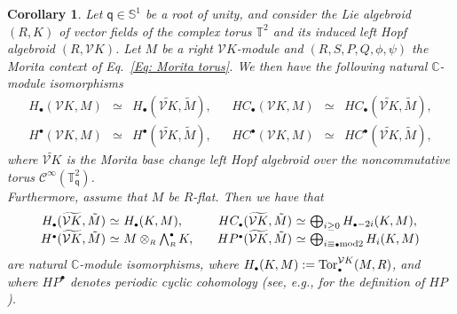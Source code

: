 \documentclass[reqno, a4paper, 10pt]{amsart}
\numberwithin{equation}{section}
\theoremstyle{plain}
\newtheorem{cor}[theorem]{Corollary}
\theoremstyle{definition}
\theoremstyle{remark}
\begin{document}
\begin{cor}
Let ${\mathsf{{q}}} \in \mathbb{S}^1$ be a root of unity,
and consider the Lie algebroid $(R,K)$  of vector fields of the complex torus $\mathbb{T}^2$ and its induced left Hopf algebroid $(R,{{\mathcal V}} K)$. 
Let $M$ be a right ${{\mathcal V}} K$-module 
and $(R,S,P,Q,\phi,\psi)$ the Morita context of Eq.~\eqref{Eq: Morita torus}. 
We then have the following natural $\mathbb{C}$-module isomorphisms
$$
\begin{array}{rclcrcl}
H_{{\scriptscriptstyle{\bullet}}}({{\mathcal V}} K , M) &\simeq & H_{{\scriptscriptstyle{\bullet}}}( \widetilde{{{\mathcal V}} K}, {\tilde{{M}}}), && HC_{{\scriptscriptstyle{\bullet}}}({{\mathcal V}} K, M) &\simeq& HC_{{\scriptscriptstyle{\bullet}}}( \widetilde{{{\mathcal V}} K}, {\tilde{{M}}}), \\
H^{{\scriptscriptstyle{\bullet}}}({{\mathcal V}} K , M) &\simeq & H^{{\scriptscriptstyle{\bullet}}}( \widetilde{{{\mathcal V}} K}, {\tilde{{M}}}), && HC^{{\scriptscriptstyle{\bullet}}}({{\mathcal V}} K, M) &\simeq& HC^{{\scriptscriptstyle{\bullet}}}( \widetilde{{{\mathcal V}} K}, {\tilde{{M}}}), 
\end{array}
$$
where $\widetilde{{{\mathcal V}} K}$ is the Morita base change left Hopf algebroid over the noncommutative torus ${{\mathcal C}}^{\infty}(\mathbb{T}_{{\mathsf{{q}}}}^2)$.\\
Furthermore,  assume that $M$ be $R$-flat. Then we have that
$$
\begin{array}{rclcrcl}
H_{{\scriptscriptstyle{\bullet}}}( \widetilde{{{\mathcal V}} K}, {\tilde{{M}}}) &\!\!\!\!\simeq&\!\!\!\!  H_{{\scriptscriptstyle{\bullet}}}(K, M), && 
HC_{{\scriptscriptstyle{\bullet}}}( \widetilde{{{\mathcal V}} K}, {\tilde{{M}}}) &\!\!\!\!\simeq&\!\!\!\! \textstyle\bigoplus_{i \geq 0}H_{{{\scriptscriptstyle{\bullet}}} -2i}(K,M), \\
H^{{\scriptscriptstyle{\bullet}}}( \widetilde{{{\mathcal V}} K}, {\tilde{{M}}}) &\!\!\!\!\simeq&\!\!\!\!  M \otimes_{{\scriptscriptstyle{R}}} \textstyle\bigwedge^{{\scriptscriptstyle{\bullet}}}_{{\scriptscriptstyle{R}}} K, && 
HP^{{\scriptscriptstyle{\bullet}}}( \widetilde{{{\mathcal V}} K}, {\tilde{{M}}}) &\!\!\!\!\simeq&\!\!\!\! \textstyle\bigoplus_{i \equiv {{\scriptscriptstyle{\bullet}}} {\rm mod} 2}H_{i}(K,M) \\
\end{array}
$$ 
are natural $\mathbb{C}$-module isomorphisms,
where $H_{{\scriptscriptstyle{\bullet}}}(K, M) :=  {{\rm Tor}}^{{{\mathcal V}} K}_{{\scriptscriptstyle{\bullet}}}(M, R)$,
 and where $HP^{{\scriptscriptstyle{\bullet}}}$ denotes periodic cyclic cohomology (see, e.g., \cite[\S5.1.3]{Lod:CH} for the definition of $HP$).
\end{cor} 
\end{document}
